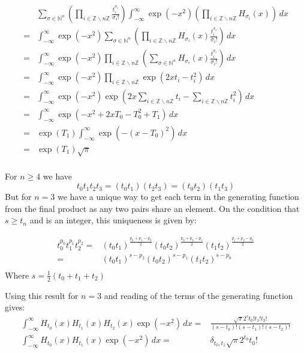 \begin{equation*}
\begin{aligned}
	&\sum_{\sigma \in \mathbb{N}^n}\left(\prod_{i\in\mathbb{Z}\backslash n\mathbb{Z}}\frac{t_i^{\sigma_i}}{\sigma_i!}\right)\int_{-\infty}^{\infty}\exp(-x^2)\left(\prod_{i\in\mathbb{Z}\backslash n\mathbb{Z}}H_{\sigma_i}(x)\right)\,dx\\
	=&\int_{-\infty}^{\infty}\exp(-x^2)\sum_{\sigma \in \mathbb{N}^n}\left(\prod_{i\in\mathbb{Z}\backslash n\mathbb{Z}}H_{\sigma_i}(x)\frac{t_i^{\sigma_i}}{\sigma_i!}\right)\,dx\\
	=&\int_{-\infty}^{\infty}\exp(-x^2)\prod_{i\in\mathbb{Z}\backslash n\mathbb{Z}}\left(\sum_{\sigma \in \mathbb{N}^n}H_{\sigma_i}(x)\frac{t_i^{\sigma_i}}{\sigma_i!}\right)\,dx\\
	=&\int_{-\infty}^{\infty}\exp(-x^2)\prod_{i\in\mathbb{Z}\backslash n\mathbb{Z}}\exp(2xt_i-t_i^2)\,dx\\
	=&\int_{-\infty}^{\infty}\exp(-x^2)\exp\left(2x\sum_{i\in\mathbb{Z}\backslash n\mathbb{Z}}t_i-\sum_{i\in\mathbb{Z}\backslash n\mathbb{Z}}t_i^2\right)\,dx\\
	=&\int_{-\infty}^{\infty}\exp\left(-x^2+2xT_0-T_0^2+T_1\right)\,dx\\
	=&\exp(T_1)\int_{-\infty}^{\infty}\exp(-(x-T_0)^2)\,dx\\
	=&\exp(T_1)\sqrt{\pi}\\
\end{aligned}
\end{equation*}

For $n\geq 4$ we have 
\[t_0t_1t_2t_3=(t_0t_1)(t_2t_3)=(t_0t_2)(t_1t_3)\]
But for $n = 3$ we have a unique way to get each term in the generating function from the final product as any two pairs share an element.
On the condition that $s \geq t_n$ and is an integer, this uniqueness is given by:

\begin{equation*}
\begin{aligned}
	t_0^{p_0}t_1^{p_1}t_2^{p_2} =& (t_0t_1)^{\frac{p_0+p_1-p_2}{2}}(t_0t_2)^{\frac{p_0+p_2-p_1}{2}}(t_1t_2)^{\frac{p_1+p_2-p_0}{2}}\\
	=&(t_0t_1)^{s-p_2}(t_0t_2)^{s-p_1}(t_1t_2)^{s-p_0}\\
\end{aligned}
\end{equation*}
Where $s = \frac{1}{2}(t_0+t_1+t_2)$

Using this result for $n=3$ and reading of the terms of the generating function gives:
\begin{equation*}
\begin{aligned}
	\int_{-\infty}^{\infty}H_{t_0}(x)H_{t_1}(x)H_{t_2}(x)\exp(-x^2)\,dx=&\frac{\sqrt{\pi}2^st_0!t_1!t_2!}{(s-t_0)!(s-t_1)!(s-t_2)!}\\
	\int_{-\infty}^{\infty}H_{t_0}(x)H_{t_1}(x)\exp(-x^2)\,dx=&\delta_{t_0,t_1}\sqrt{\pi}2^{t_0}t_0!\\
\end{aligned}
\end{equation*}

